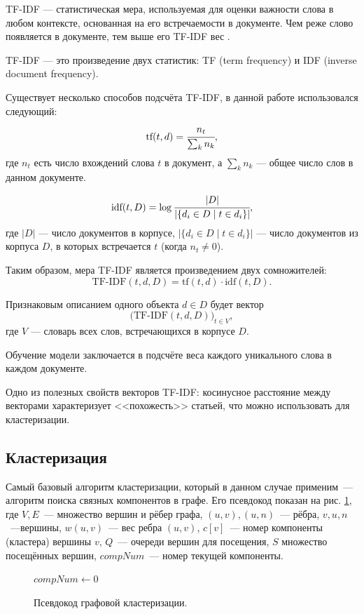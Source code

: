 \documentclass[a4paper, 14pt]{extarticle}
\begin{document}
TF-IDF --- статистическая мера, используемая для оценки важности слова в любом контексте, основанная на его встречаемости в документе. Чем реже слово появляется в документе, тем выше его TF-IDF вес \cite{doi:10.1108/eb026526}.

TF-IDF --- это произведение двух статистик: TF (term frequency) и IDF (inverse 
document frequency). 

Существует несколько способов подсчёта TF-IDF, в данной работе использовался следующий:
$$
\text{tf}(t, d) = \cfrac{n_t}{\sum_{k} n_k},
$$
где $n_{t}$ есть число вхождений слова $t$ в документ, а $\sum_{k} n_k$ --- общее число слов в данном документе.

$$
\text{idf}(t, D) = \log{ \cfrac{|D|}{|\{ d_i \in D \mid t \in d_i \}|}},
$$
где $|D|$ --- число документов в корпусе, $|\{ d_i \in D \mid t \in d_i \}|$ — число документов из корпуса $D$, в которых встречается 
$t$ (когда $n_{t} \neq 0$).

Таким образом, мера TF-IDF является произведением двух сомножителей:
$$
\text{TF-IDF}(t, d, D) = \text{tf}(t, d) \cdot \text{idf}(t, D).
$$

Признаковым описанием одного объекта $d \in D$ будет вектор
$$
\big(\text{TF-IDF}(t,d,D)\big)_{t\in V},
$$
где $V$ --- словарь всех слов, встречающихся в корпусе $D$.

Обучение модели заключается в подсчёте веса каждого уникального слова в каждом документе.

Одно из полезных свойств векторов TF-IDF: косинусное расстояние между векторами характеризует <<похожесть>> статьей, что можно использовать для кластеризации.

\subsection{Кластеризация}
Самый базовый алгоритм кластеризации, который в данном случае применим~--- алгоритм поиска связных компонентов в графе. Его псевдокод показан на рис. \ref{pseudo}, где $V, E$~--- множество вершин и рёбер графа, $(u,v),(u,n)$~--- рёбра, $v,u,n$~---вершины, 
$w(u,v)$~--- вес ребра $(u,v)$, $c[v]$~--- номер компоненты (кластера) вершины $v$, $Q$~--- очереди вершин для посещения, $S$ множество посещённых вершин, $compNum$~--- номер текущей компоненты.

\begin{figure}
	\begin{algorithm}[H]
		\DontPrintSemicolon
		$ compNum \gets 0 $\;
	\end{algorithm}
	\caption{Псевдокод графовой кластеризации.}
	\label{pseudo}
\end{figure}
\end{document}

